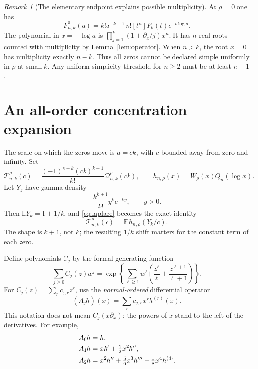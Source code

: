 \documentclass[11pt]{article}
\theoremstyle{definition}
\theoremstyle{remark}
\newtheorem{remark}[theorem]{Remark}
\newcommand{\EE}{\mathbb E}
\newcommand{\D}{\mathcal D}
\newcommand{\Tcal}{\mathcal T}
\begin{document}
\begin{remark}[The elementary endpoint explains possible multiplicity]
At $\rho=0$ one has
\[
 F_{n,k}^{0}(a)=k!a^{-k-1}\,n![t^n]P_k(t)e^{-t\log a}.
\]
The polynomial in $x=-\log a$ is $\prod_{j=1}^k(1+\partial_x/j)x^n$. It has $n$ real roots counted with multiplicity by Lemma~\ref{lem:operator}. When $n>k$, the root $x=0$ has multiplicity exactly $n-k$. Thus all zeros cannot be declared simple uniformly in $\rho$ at small $k$. Any uniform simplicity threshold for $n\geq2$ must be at least $n-1$.
\end{remark}

\section{An all-order concentration expansion}
\label{sec:concentration}

The scale on which the zeros move is $a=ck$, with $c$ bounded away from zero and infinity. Set
\begin{equation}\label{eq:normalized}
 \Tcal_{n,k}^{\rho}(c)
   =\frac{(-1)^{n+k}(ck)^{k+1}}{k!}\D_{n,k}^{\rho}(ck),
 \qquad h_{n,\rho}(x)=W_\rho(x)Q_n(\log x).
\end{equation}
Let $Y_k$ have gamma density
\[
 \frac{k^{k+1}}{k!}y^k e^{-ky},\qquad y>0.
\]
Then $\EE Y_k=1+1/k$, and \eqref{eq:laplace} becomes the exact identity
\begin{equation}\label{eq:expectation}
 \Tcal_{n,k}^{\rho}(c)=\EE\,h_{n,\rho}(Y_k/c).
\end{equation}
The shape is $k+1$, not $k$; the resulting $1/k$ shift matters for the constant term of each zero.

Define polynomials $C_j$ by the formal generating function
\begin{equation}\label{eq:Cgen}
 \sum_{j\geq0}C_j(z)w^j
   =\exp\left\{\sum_{\ell\geq1}w^\ell
       \left(\frac{z^\ell}{\ell}+\frac{z^{\ell+1}}{\ell+1}\right)\right\}.
\end{equation}
For $C_j(z)=\sum_r c_{j,r}z^r$, use the \emph{normal-ordered} differential operator
\begin{equation}\label{eq:Aj}
 (A_jh)(x)=\sum_r c_{j,r}x^r h^{(r)}(x).
\end{equation}
This notation does not mean $C_j(x\partial_x)$: the powers of $x$ stand to the left of the derivatives. For example,
\begin{align}
 A_0h&=h,\notag\\
 A_1h&=xh'+\tfrac12x^2h'',\label{eq:Afirst}\\
 A_2h&=x^2h''+\tfrac56x^3h'''+\tfrac18x^4h^{(4)}.\notag
\end{align}
\end{document}
